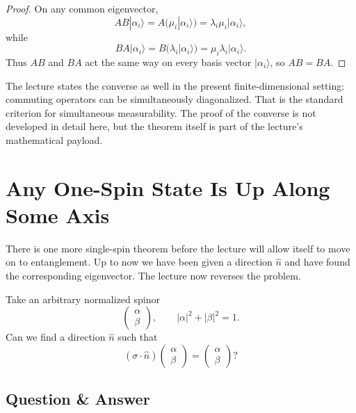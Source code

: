\begin{proof}
On any common eigenvector,
\begin{equation}
AB|\alpha_i\rangle
=
A(\mu_i|\alpha_i\rangle)
=
\lambda_i\mu_i|\alpha_i\rangle,
\end{equation}
while
\begin{equation}
BA|\alpha_i\rangle
=
B(\lambda_i|\alpha_i\rangle)
=
\mu_i\lambda_i|\alpha_i\rangle.
\end{equation}
Thus \(AB\) and \(BA\) act the same way on every basis vector \(|\alpha_i\rangle\), so \(AB=BA\).
\end{proof}

The lecture states the converse as well in the present finite-dimensional setting: commuting operators can be simultaneously diagonalized. That is the standard criterion for simultaneous measurability. The proof of the converse is not developed in detail here, but the theorem itself is part of the lecture's mathematical payload.

\section{Any One-Spin State Is Up Along Some Axis}

There is one more single-spin theorem before the lecture will allow itself to move on to entanglement. Up to now we have been given a direction \(\hat n\) and have found the corresponding eigenvector. The lecture now reverses the problem.

Take an arbitrary normalized spinor
\begin{equation}
\begin{pmatrix}
\alpha\\
\beta
\end{pmatrix},
\qquad
|\alpha|^2+|\beta|^2=1.
\end{equation}
Can we find a direction \(\hat n\) such that
\begin{equation}
(\sigma\cdot\hat n)
\begin{pmatrix}
\alpha\\
\beta
\end{pmatrix}
=
\begin{pmatrix}
\alpha\\
\beta
\end{pmatrix}?
\end{equation}

\subsection{Question \& Answer}

